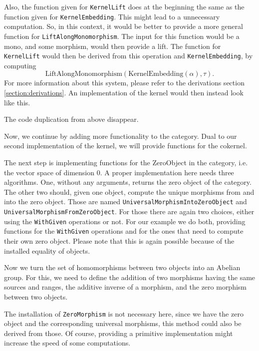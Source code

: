 Also, the function given for \texttt{KernelLift} does at the beginning the same as the function given for \texttt{KernelEmbedding}. This might lead to
a unnecessary computation. So, in this context, it would be better to provide a more general function for \texttt{LiftAlongMonomorphism}.
The input for this function would be a mono, and some morphism, would then provide a lift. The function for \texttt{KernelLift} would then be derived
from this operation and \texttt{KernelEmbedding}, by computing
\[
 \mathrm{LiftAlongMonomorphism} \left( \mathrm{KernelEmbedding} \left( \alpha \right), \tau \right).
\]
For more information about this system, please refer to the derivations section \ref{section:derivations}.
An implementation of the kernel would then instead look like this.



The code duplication from above disappear.

Now, we continue by adding more functionality to the category. Dual to our second implementation of the kernel,
we will provide functions for the cokernel.



The next step is implementing functions for the \textrm{ZeroObject} in the category, i.e. the vector space
of dimension 0. A proper implementation here needs three algorithms. One, without any arguments, returns the
zero object of the category. The other two should, given one object, compute the unique morphisms from and into
the zero object. Those are named \texttt{UniversalMorphismIntoZeroObject} and \texttt{UniversalMorphismFromZeroObject}.
For those there are again two choices, either using the \texttt{WithGiven} operations or not.
For our example we do both, providing functions for the \texttt{WithGiven} operations and for the ones that
need to compute their own zero object. Please note that this is again possible because of the installed equality of objects.



Now we turn the set of homomorphisms between two objects into an Abelian group. For this, we need to define the addition of
two morphisms having the same sources and ranges, the additive inverse of a morphism, and the zero morphism between two objects.



The installation of \texttt{ZeroMorphism} is not necessary here, since we have the zero object and the corresponding
universal morphisms, this method could also be derived from those. Of course, providing a primitive implementation might
increase the speed of some computations.

